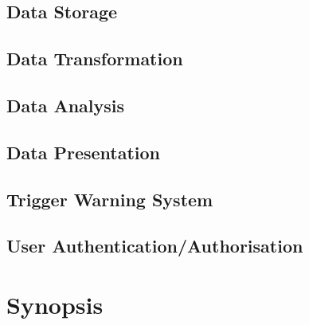 \subsection{Data Storage}

\subsection{Data Transformation}

\subsection{Data Analysis}

\subsection{Data Presentation}

\subsection{Trigger Warning System}

\subsection{User Authentication/Authorisation}

\section{Synopsis}